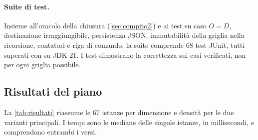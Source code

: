 \paragraph{Suite di test.} Insieme all'oracolo della chiusura
(\cref{sec:compito2}) e ai test su caso $O=D$, destinazione irraggiungibile,
persistenza JSON, immutabilità della griglia nella ricorsione, contatori e
riga di comando, la suite comprende 68 test JUnit, tutti superati con
 su JDK 21. I test dimostrano la correttezza sui casi
verificati, non per ogni griglia possibile.

\subsection{Risultati del piano}
\label{sec:risultati}

La \cref{tab:risultati} riassume le 67 istanze per dimensione e densità per
le due varianti principali. I tempi sono le mediane delle singole istanze,
in millisecondi, e comprendono entrambi i versi.

